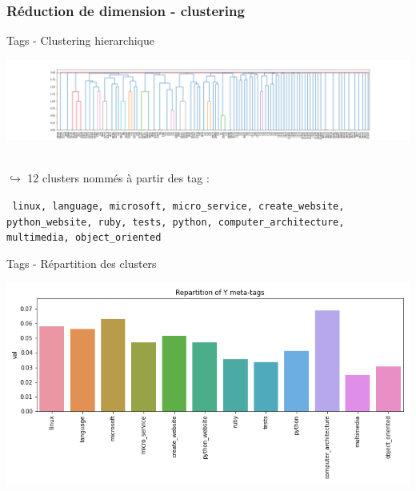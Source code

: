 \documentclass[10pt]{beamer}
\begin{document}
\subsubsection*{Réduction de dimension - clustering}
\begin{frame}{Tags - Clustering hierarchique}
    \begin{center}
       \includegraphics[width=\linewidth]{figures/hierarchical_clustering.png}
    \end{center}\\
    
    $\hookrightarrow$ 12 clusters nommés à partir des tag :\\
    \begin{center}
        {\small \texttt{ linux, language, microsoft, micro\_service, create\_website, python\_website, ruby, tests, python, computer\_architecture, multimedia, object\_oriented }}
    \end{center}
\end{frame}
\begin{frame}{Tags - Répartition des clusters}
    \begin{center}
       \includegraphics[width=\linewidth]{figures/Y_distribution.png}
    \end{center}
\end{frame}
\end{document}
